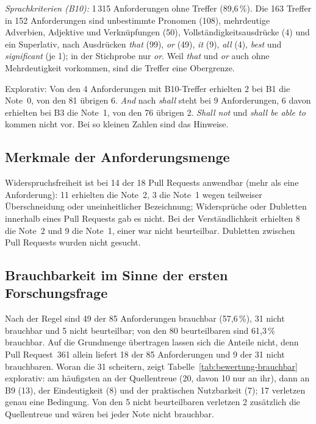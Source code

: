 \documentclass[11pt,a4paper]{report}
\begin{document}
\emph{Sprachkriterien (B10):} 1\,315 Anforderungen ohne Treffer
(89,6\,\%). Die 163 Treffer in 152 Anforderungen sind unbestimmte
Pronomen (108), mehrdeutige Adverbien, Adjektive und Verknüpfungen (50),
Vollständigkeitsausdrücke (4) und ein Superlativ, nach Ausdrücken
\emph{that} (99), \emph{or} (49), \emph{it} (9), \emph{all} (4),
\emph{best} und \emph{significant} (je 1); in der Stichprobe nur
\emph{or}. Weil \emph{that} und \emph{or} auch ohne Mehrdeutigkeit
vorkommen, sind die Treffer eine Obergrenze.

Explorativ: Von den 4 Anforderungen mit B10-Treffer erhielten 2 bei B1
die Note~0, von den 81 übrigen 6. \emph{And} nach \emph{shall} steht bei
9 Anforderungen, 6 davon erhielten bei B3 die Note~1, von den 76 übrigen
2. \emph{Shall not} und \emph{shall be able to} kommen nicht vor. Bei so
kleinen Zahlen sind das Hinweise.

\subsection{Merkmale der Anforderungsmenge}
\label{subsec:bewertung-menge}

Widerspruchsfreiheit ist bei 14 der 18 Pull Requests anwendbar (mehr als
eine Anforderung): 11 erhielten die Note~2, 3 die Note~1 wegen
teilweiser Überschneidung oder uneinheitlicher Bezeichnung; Widersprüche
oder Dubletten innerhalb eines Pull Requests gab es nicht. Bei der
Verständlichkeit erhielten 8 die Note~2 und 9 die Note~1, einer war nicht
beurteilbar. Dubletten zwischen Pull Requests wurden nicht gesucht.

\subsection{Brauchbarkeit im Sinne der ersten Forschungsfrage}
\label{subsec:bewertung-brauchbar}

Nach der Regel sind 49 der 85 Anforderungen brauchbar (57,6\,\%), 31
nicht brauchbar und 5 nicht beurteilbar; von den 80 beurteilbaren sind
61,3\,\% brauchbar. Auf die Grundmenge übertragen lassen sich die Anteile
nicht, denn Pull Request~361 allein liefert 18 der 85 Anforderungen und
9 der 31 nicht brauchbaren. Woran die 31 scheitern, zeigt
Tabelle~\ref{tab:bewertung-brauchbar} explorativ: am häufigsten an der
Quellentreue (20, davon 10 nur an ihr), dann an B9 (13), der
Eindeutigkeit (8) und der praktischen Nutzbarkeit (7); 17 verletzen genau
eine Bedingung. Von den 5 nicht beurteilbaren verletzen 2 zusätzlich die
Quellentreue und wären bei jeder Note nicht brauchbar.
\end{document}
